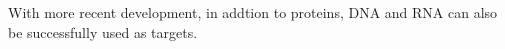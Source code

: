 With more recent development, in addtion to proteins, DNA and RNA can also be successfully used as targets. 
